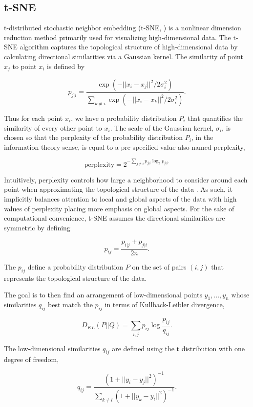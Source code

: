 \documentclass{article}
\begin{document}
\subsection{t-SNE}
t-distributed stochastic neighbor embedding (t-SNE, \cite{t-SNE}) is a nonlinear dimension reduction method primarily used for visualizing high-dimensional data. The t-SNE algorithm captures the topological structure of high-dimensional data by calculating directional similarities via a Gaussian kernel. The similarity of point $x_j$ to point $x_i$ is defined by \begin{linenomath}$$p_{j|i} = \frac{\exp(-||x_i - x_j||^2/2\sigma_i^2)}{\sum_{k \neq i} \exp(-||x_i-x_k||^2/2\sigma_i^2)}.$$\end{linenomath} Thus for each point $x_i$, we have a probability distribution $P_i$ that quantifies the similarity of every other point to $x_i$. The scale of the Gaussian kernel, $\sigma_i$, is chosen so that the perplexity of the probability distribution $P_i$, in the information theory sense, is equal to a pre-specified value also named perplexity, \begin{linenomath}$$\textrm{perplexity} = 2^{-\sum_{j \neq i} p_{j|i}\log_2 p_{j|i}.}$$\end{linenomath} Intuitively, perplexity controls how large a neighborhood to consider around each point when approximating the topological structure of the data \cite{t-SNE}. As such, it implicitly balances attention to local and global aspects of the data with high values of perplexity placing more emphasis on global aspects. For the sake of computational convenience, t-SNE assumes the directional similarities are symmetric by defining \begin{linenomath}$$p_{ij} = \frac{p_{i|j} + p_{j|i}}{2n}.$$\end{linenomath} The $p_{ij}$ define a probability distribution $P$ on the set of pairs $(i,j)$ that represents the topological structure of the data.

The goal is to then find an arrangement of low-dimensional points $y_1, \hdots, y_n$ whose similarities $q_{ij}$ best match the $p_{ij}$ in terms of Kullback-Leibler divergence, \begin{linenomath}$$D_{KL}(P || Q) = \sum_{i,j} p_{ij} \log \frac{p_{ij}}{q_{ij}}.$$\end{linenomath} The low-dimensional similarities $q_{ij}$ are defined using the t distribution with one degree of freedom, \begin{linenomath}$$q_{ij} = \frac{(1 + ||y_i - y_j||^2)^{-1}}{ \sum_{k \neq l} (1 + ||y_k - y_l||^2)^{-1}}.$$\end{linenomath}
\end{document}
